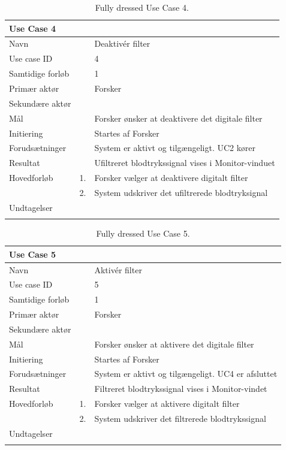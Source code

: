\begin{longtabu} to  %
    {\large \textbf{Use Case 4}} && \\
    \toprule
    Navn &&    Deaktivér filter\\
    Use case ID &&    4\\
    Samtidige forløb &&   1\\
    Primær aktør &&    Forsker\\
    Sekundære aktør &&	 \\
    Mål &&    Forsker ønsker at deaktivere det digitale filter\\
    Initiering &&	Startes af Forsker\\
    Forudsætninger &&  System er aktivt og tilgængeligt. UC2 kører  \\
    Resultat &&		Ufiltreret blodtrykssignal vises i Monitor-vinduet                 \\ \midrule
    Hovedforløb &    1. &    Forsker vælger at deaktivere digitalt filter \\[-1ex]   						 	
                &    2. &    System udskriver det ufiltrerede blodtryksignal\newline\\ \midrule
                
    Undtagelser &     &      \\ \bottomrule
\caption{Fully dressed Use Case 4.}
\label{UC4}
\end{longtabu}


\begin{longtabu} to  %
    {\large \textbf{Use Case 5}} && \\
    \toprule
    Navn &&    Aktivér filter\\
    Use case ID &&    5\\
    Samtidige forløb &&   1\\
    Primær aktør &&    Forsker\\
    Sekundære aktør &&	 \\
    Mål &&    Forsker ønsker at aktivere det digitale filter\\
    Initiering &&	Startes af Forsker\\
    Forudsætninger &&  System er aktivt og tilgængeligt. UC4 er afsluttet  \\
    Resultat &&		Filtreret blodtrykssignal vises i Monitor-vindet                 \\ \midrule
    Hovedforløb &    1. &    Forsker vælger at aktivere digitalt filter\\[-1ex]   						 	
                &    2. &    System udskriver det filtrerede blodtrykssignal\newline\\ \midrule
                
    Undtagelser &     &      \\ \bottomrule
\caption{Fully dressed Use Case 5.}
\label{UC5}
\end{longtabu}
    
